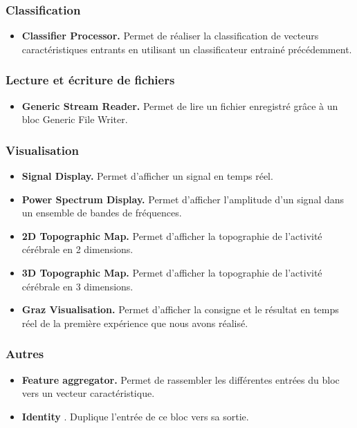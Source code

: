 \subsubsection*{Classification}
\begin{itemize}
	\smallbreak
	\item \textbf{Classifier Processor.} Permet de réaliser la classification de vecteurs  caractéristiques entrants en utilisant un classificateur entrainé précédemment.
	
\end{itemize}

\subsubsection*{Lecture et écriture de fichiers}
\begin{itemize}
	\smallbreak
	\item \textbf{Generic Stream Reader.} Permet de lire un fichier enregistré grâce à un bloc Generic File Writer.
	\smallbreak
\end{itemize}

\subsubsection*{Visualisation}
\begin{itemize}
	\smallbreak
	\item\textbf{Signal Display.} Permet d'afficher un signal en temps réel.
	\smallbreak
	\item\textbf{Power Spectrum Display.} Permet d'afficher l'amplitude d'un signal dans un ensemble de bandes de fréquences.
	\smallbreak
	\item \textbf{2D Topographic Map.} Permet d'afficher la topographie de l'activité cérébrale en 2 dimensions.
	\smallbreak
	\item \textbf{3D Topographic Map.} Permet d'afficher la topographie de l'activité cérébrale en 3 dimensions.
	\smallbreak
	\item\textbf{Graz Visualisation.} Permet d'afficher la consigne et le résultat en temps réel de la première expérience que nous avons réalisé.
\end{itemize}

\subsubsection{Autres}
\begin{itemize}
	\smallbreak
	\item \textbf{Feature aggregator.} Permet de rassembler les différentes entrées du bloc vers un vecteur caractéristique.
	\smallbreak
	\item\textbf{Identity }. Duplique l'entrée de ce bloc vers sa sortie.
\end{itemize}


